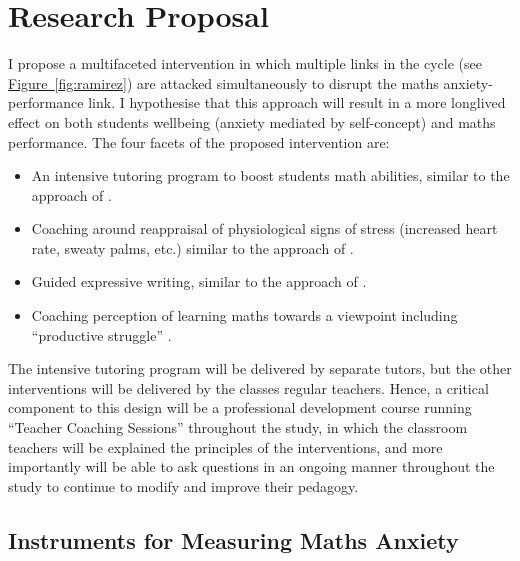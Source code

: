 \documentclass[14pt]{memoir}
\newcommand{\reffig}[1]{\hyperref[fig:#1]{Figure~\ref{fig:#1}}}
\begin{document}
\section{Research Proposal}

I propose a multifaceted intervention in which multiple links in the cycle (see \reffig{ramirez}) are attacked simultaneously to disrupt the maths anxiety-performance link. I hypothesise that this approach will result in a more longlived effect on both students wellbeing (anxiety mediated by self-concept) and maths performance. The four facets of the proposed intervention are:
\begin{itemize}
	\item An intensive tutoring program to boost students math abilities, similar to the approach of .
	\item Coaching around reappraisal of physiological signs of stress (increased heart rate, sweaty palms, etc.) similar to the approach of .
	\item Guided expressive writing, similar to the approach of .
	\item Coaching perception of learning maths towards a viewpoint including ``productive struggle'' \cite{Hiebert2007}.
\end{itemize}

The intensive tutoring program will be delivered by separate tutors, but the other interventions will be delivered by the classes regular teachers. Hence, a critical component to this design will be a professional development course running ``Teacher Coaching Sessions'' throughout the study, in which the classroom teachers will be explained the principles of the interventions, and more importantly will be able to ask questions in an ongoing manner throughout the study to continue to modify and improve their pedagogy.

\subsection*{Instruments for Measuring Maths Anxiety}
\end{document}
